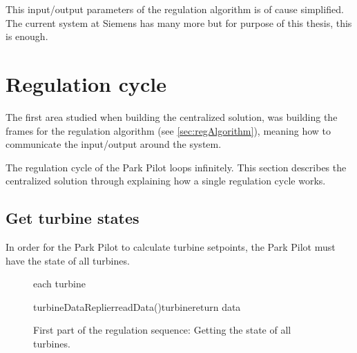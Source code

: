 This input/output parameters of the regulation algorithm is of cause simplified. The current system at Siemens has many more but for purpose of this thesis, this is enough. 



\section{Regulation cycle}\label{sec:currentSystemCen} 

The first area studied when building the centralized solution, was building the frames for the regulation algorithm (see \cref{sec:regAlgorithm}), meaning how to communicate the input/output around the system. 

The regulation cycle of the Park Pilot loops infinitely. This section describes the centralized solution through explaining how a single regulation cycle works.

\subsection{Get turbine states}\label{sec:getTurbineStates}

In order for the Park Pilot to calculate turbine setpoints, the Park Pilot must have the state of all turbines.

\begin{figure}
	\centering
	\begin{sequencediagram} %
	
		\begin{sdblock}{each turbine}{}
			\begin {call}{turbineDataReplier}{readData()}{turbine}{return data}
			\end {call}
		\end{sdblock}				
	\end{sequencediagram}

	\caption[First part of the regulation cycle]{
		\label{fig:getStatesOfTurbines} 
		\footnotesize{%
			First part of the regulation sequence: Getting the state of all turbines.
		}
	}
\end{figure}

